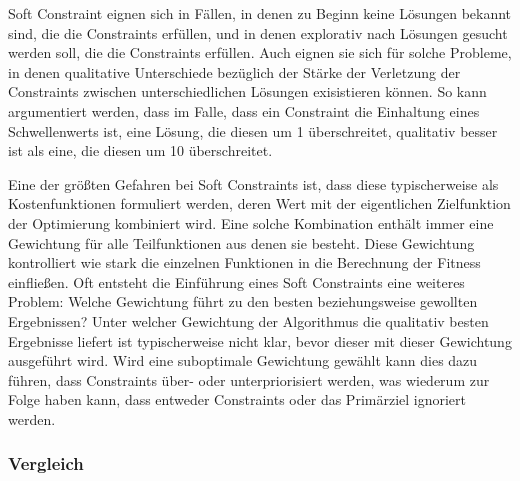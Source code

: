 Soft Constraint eignen sich in Fällen, in denen zu Beginn keine Lösungen bekannt sind, die die Constraints erfüllen, und in denen explorativ nach Lösungen gesucht werden soll, die die Constraints erfüllen.
Auch eignen sie sich für solche Probleme, in denen qualitative Unterschiede bezüglich der Stärke der Verletzung der Constraints zwischen unterschiedlichen Lösungen exisistieren können.
So kann argumentiert werden, dass im Falle, dass ein Constraint die Einhaltung eines Schwellenwerts ist, eine Lösung, die diesen um 1 überschreitet, qualitativ besser ist als eine, die diesen um 10 überschreitet.

Eine der größten Gefahren bei Soft Constraints ist, dass diese typischerweise als Kostenfunktionen formuliert werden, deren Wert mit der eigentlichen Zielfunktion der Optimierung kombiniert wird.
Eine solche Kombination enthält immer eine Gewichtung für alle Teilfunktionen aus denen sie besteht.
Diese Gewichtung kontrolliert wie stark die einzelnen Funktionen in die Berechnung der Fitness einfließen.
Oft entsteht die Einführung eines Soft Constraints eine weiteres Problem:
Welche Gewichtung führt zu den besten beziehungsweise gewollten Ergebnissen?
Unter welcher Gewichtung der Algorithmus die qualitativ besten Ergebnisse liefert ist typischerweise nicht klar, bevor dieser mit dieser Gewichtung ausgeführt wird.
Wird eine suboptimale Gewichtung gewählt kann dies dazu führen, dass Constraints über- oder unterpriorisiert werden, was wiederum zur Folge haben kann, dass entweder Constraints oder das Primärziel ignoriert werden.


\subsubsection{Vergleich}


